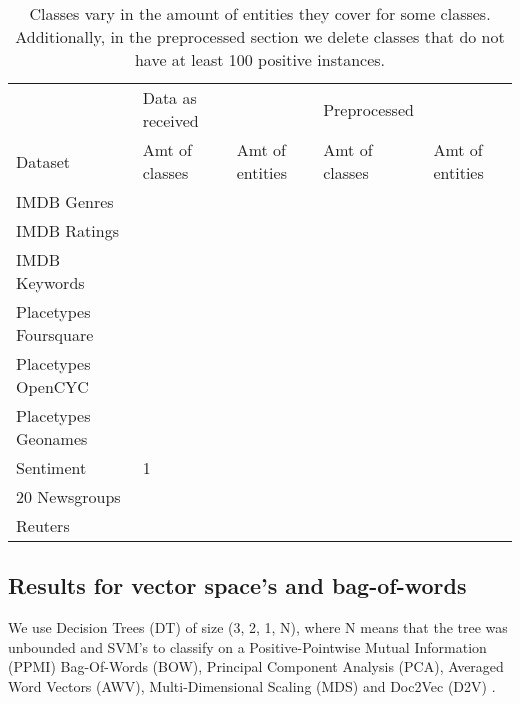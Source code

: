 \begin{table}[]
	\begin{tabular}{lllll}
		& Data as received &                 & Preprocessed   &                 \\
		Dataset               & Amt of classes   & Amt of entities & Amt of classes & Amt of entities \\
		IMDB Genres           &                  &                 &                &                 \\
		IMDB Ratings          &                  &                 &                &                 \\
		IMDB Keywords         &                  &                 &                &                 \\
		Placetypes Foursquare &                  &                 &                &                 \\
		Placetypes OpenCYC    &                  &                 &                &                 \\
		Placetypes Geonames   &                  &                 &                &                 \\
		Sentiment             &  1                &                 &                &                 \\
		20 Newsgroups         &                  &                 &                &                 \\
		Reuters               &                  &                 &                &                
	\end{tabular}
\caption{Classes vary in the amount of entities they cover for some classes. Additionally, in the preprocessed section we delete classes that do not have at least 100 positive instances.}
\label{table:ClassStats}
\end{table}



\subsection{Results for vector space's and bag-of-words}
We use Decision Trees (DT) of size (3, 2, 1, N), where N means that the tree was unbounded and SVM's to classify on a Positive-Pointwise Mutual Information (PPMI) Bag-Of-Words (BOW), Principal Component Analysis (PCA), Averaged Word Vectors (AWV), Multi-Dimensional Scaling (MDS) and Doc2Vec (D2V) \cite{Le2014}. 

